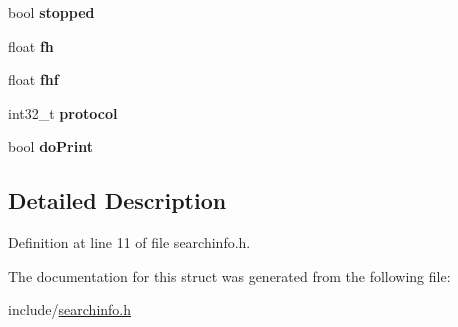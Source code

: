 \begin{DoxyCompactItemize}
bool {\bfseries stopped}
\item 
\mbox{\label{structSearchInfo_aaf93702aef0d1eb5754b0b1e35574631}} 
float {\bfseries fh}
\item 
\mbox{\label{structSearchInfo_a0a6e9abcf065a2c0f7245f47db569abe}} 
float {\bfseries fhf}
\item 
\mbox{\label{structSearchInfo_ac3f008988acc4aa6fceb4e120a9471cb}} 
int32\+\_\+t {\bfseries protocol}
\item 
\mbox{\label{structSearchInfo_a2cc71d1a67abdc16091a32f269685032}} 
bool {\bfseries do\+Print}
\end{DoxyCompactItemize}


\subsection{Detailed Description}


Definition at line 11 of file searchinfo.\+h.



The documentation for this struct was generated from the following file\+:\begin{DoxyCompactItemize}
\item 
include/\mbox{\hyperlink{searchinfo_8h}{searchinfo.\+h}}\end{DoxyCompactItemize}
